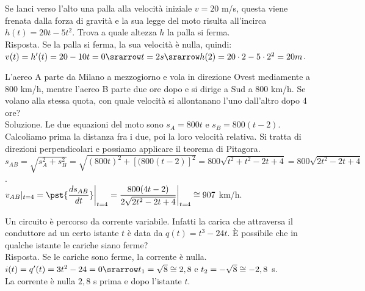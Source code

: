 \begin{esempio}
 Se lanci verso l'alto una palla alla velocità iniziale $v=20$ m/s, questa 
viene  frenata dalla forza di gravità e la sua legge del moto risulta all'incirca  $h(t)=20t-5t^2$. Trova a quale altezza $h$ la palla si ferma.\\
 Risposta. Se la palla si ferma, la sua velocità è nulla, quindi:\\
 $v(t)=h'(t)= 20-10t=0\srarrow t=2 s \srarrow h(2)=20\cdot 
2-5\cdot  2^2=20 m$.\\
\end{esempio}

\begin{esempio}
L'aereo A parte da Milano a mezzogiorno e vola in direzione Ovest 
mediamente a 
$800$ km/h, mentre l'aereo B parte due ore dopo e si dirige a Sud a $800$ 
km/h. Se volano alla stessa quota, con quale velocità si allontanano l'uno 
dall'altro dopo 4 ore?\\
Soluzione. Le due equazioni del moto sono $s_A=800t$ e $s_B=800(t-2)$. 
Calcoliamo prima la distanza fra i due, poi la loro velocità relativa.
Si tratta di direzioni perpendicolari e possiamo applicare il teorema di 
Pitagora.\\
$s_{AB}=\sqrt{s_A^2+s_B^2}=\sqrt{(800t)^2+[(800(t-2)]^2}=
800\sqrt{t^2+t^2-2t+4}=800\sqrt{2t^2-2t+4}$.\\
$v_{AB}|_{t=4}=\pst{\dfrac{ds_{AB}}{dt}}\bigg|_{t=4}=\dfrac{800(4t-2)}{2\sqrt{2t^2-2t+4}}\bigg|_{t=4}\cong 907$ km/h.
\end{esempio}

\begin{esempio}
 Un circuito è percorso da corrente variabile. Infatti la carica che 
attraversa il conduttore ad un certo istante $t$ è data da $q(t)=t^3-24t$.
È possibile che in qualche istante le cariche siano ferme?\\
Risposta. Se le cariche sono ferme, la corrente è nulla.\\ 
$i(t)=q'(t)=3t^2-24=0\srarrow t_1=\sqrt{8}\cong 2,8
\mbox{  e } t_2=-\sqrt{8} \cong -2,8$ s.\\
La corrente è nulla $2,8$ s prima e dopo l'istante $t$.
\end{esempio}

